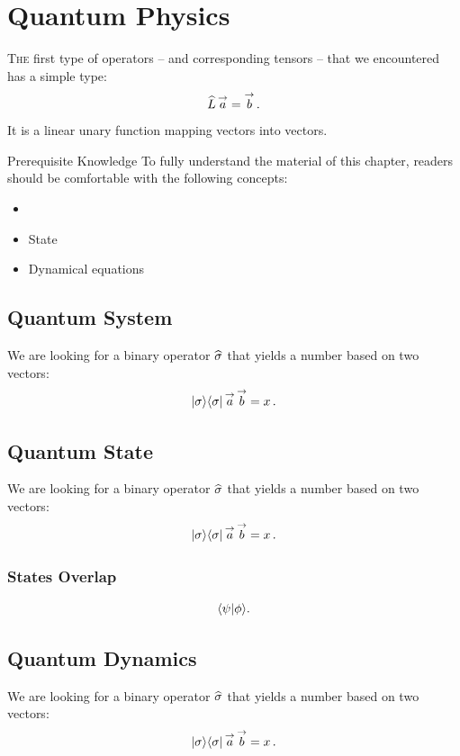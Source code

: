 \graphicspath{{../05QuantumPhysics/pics/}}

\chapter{Quantum Physics}\label{ch:QuantumPhysics}
\lettrine[lines=2]{\color{darkocre}T}{he} first type of operators -- and
corresponding tensors -- that we encountered has a simple type:
\[
\widehat{L}\,\overset{\rightarrow}{a} = \overset{\rightarrow}{b}\,.
\]
It is a linear unary function mapping vectors into vectors.


\begin{myprereq}{Prerequisite Knowledge}
To fully understand the material of this chapter, readers should be comfortable with the following concepts:

\begin{itemize}
	\item \phantom{phantom}
	\vspace{-0.5cm}
	\item State
	\item Dynamical equations
\end{itemize}	
\end{myprereq}

\section{Quantum System}\label{sec:QuantumSystem}
We are looking for a binary operator $\widehat{\sigma}$ that yields a number
based on two vectors:
\[
|{\sigma}\rangle\langle{\sigma}|\,\overset{\rightarrow}{a}\,\overset{\rightarrow}{b}=x\,.
\]

\section{Quantum State}\label{sec:QuantumState}
We are looking for a binary operator $\widehat{\sigma}$ that yields a number
based on two vectors:
\[
|{\sigma}\rangle\langle{\sigma}|\,\overset{\rightarrow}{a}\,\overset{\rightarrow}{b}=x\,.
\]
\subsection{States Overlap}
\[
\langle{\psi}|{\phi\rangle}.
\]

\section{Quantum Dynamics}\label{sec:QuantumDynamics}
We are looking for a binary operator $\widehat{\sigma}$ that yields a number
based on two vectors:
\[
|{\sigma}\rangle\langle{\sigma}|\,\overset{\rightarrow}{a}\,\overset{\rightarrow}{b}=x\,.
\]

